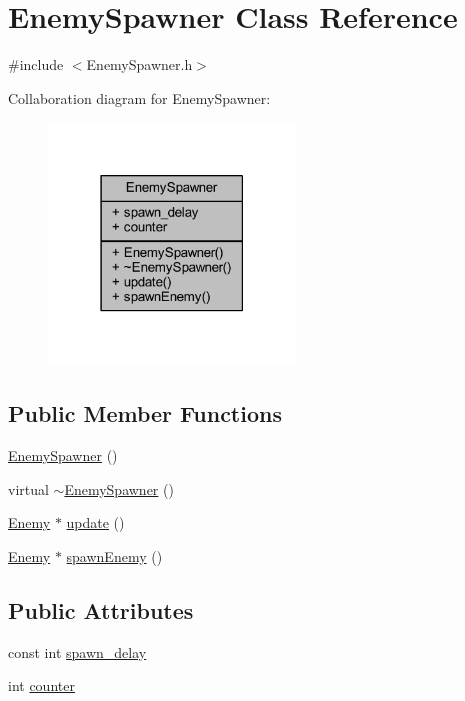 \hypertarget{class_enemy_spawner}{}\section{Enemy\+Spawner Class Reference}
\label{class_enemy_spawner}


{\ttfamily \#include $<$Enemy\+Spawner.\+h$>$}



Collaboration diagram for Enemy\+Spawner\+:
\nopagebreak
\begin{figure}[H]
\begin{center}
\leavevmode
\includegraphics[width=186pt]{class_enemy_spawner__coll__graph}
\end{center}
\end{figure}
\subsection*{Public Member Functions}
\begin{DoxyCompactItemize}
\item 
\hyperlink{class_enemy_spawner_a4c3dac46ddd4f9e97bac15cf42b2f931}{Enemy\+Spawner} ()
\item 
virtual \hyperlink{class_enemy_spawner_a661639d8aa3e52a1249883c34d11f0ad}{$\sim$\+Enemy\+Spawner} ()
\item 
\hyperlink{class_enemy}{Enemy} $\ast$ \hyperlink{class_enemy_spawner_a1b00731679380c088027072b11583d6c}{update} ()
\item 
\hyperlink{class_enemy}{Enemy} $\ast$ \hyperlink{class_enemy_spawner_adc9ba92ad7028dc28e1599fea871e132}{spawn\+Enemy} ()
\end{DoxyCompactItemize}
\subsection*{Public Attributes}
\begin{DoxyCompactItemize}
\item 
const int \hyperlink{class_enemy_spawner_a925cbf3cbaadaf7b376ef6aadc955d7f}{spawn\+\_\+delay}
\item 
int \hyperlink{class_enemy_spawner_a10072a5aab9a1d055df222ee0ef3fe6e}{counter}
\end{DoxyCompactItemize}


